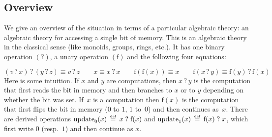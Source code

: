 \documentclass{LMCS}
\newcommand{\hide}[1]{}
\newcommand{\codefont}[1]{\mathtt{#1}}
\newcommand{\defeq}{\mathrel{\,\stackrel{\mbox{\tiny{$\mathrm{def}$}}}=\,}}
\begin{document}
\subsection{Overview}
\label{sec:overview}
\newcommand{\ifp}[3]{\codefont{if}^p~#1~\codefont{then}~#2~\codefont{else}~#3}
\newcommand{\cbvif}[3]{\codefont{if}~#1~\codefont{then}~#2~\codefont{else}~#3}
\newcommand{\sif}[3]{\mathrm{if}~#1~\mathrm{then}~#2~\mathrm{else}~#3}
\newcommand{\oread}[2]{#1\mathrel{?}#2}
\newcommand{\oprint}[1]{\mathrm{p}_{#1}}
\newcommand{\eprint}{\mathtt{print}}
\newcommand{\sprint}{\mathrm{print}}
\newcommand{\etoss}{\mathtt{toss}}
\newcommand{\stoss}{\mathrm{toss}}
\newcommand{\owrite}[2]{\mathrm{update}_{#1}(#2)}
\newcommand{\oflip}[1]{\mathrm{f}(#1)}
\newcommand{\cpsflip}[1]{\mathrm{f}[#1]}
\newcommand{\opread}[3]{#2\mathrel{?_{#1}}#3}
\newcommand{\opwrite}[3]{\mathrm{w}_{#2,#1}(#3)}
\newcommand{\opflip}[2]{\mathrm{f}_{#1}(#2)}
\newcommand{\oreadname}{(?)}
\newcommand{\oflipname}{(\mathrm{f})}
\newcommand{\owritename}[1]{\mathrm{w}_{#1}}
\newcommand{\eread}{\mathtt{deref}}
\newcommand{\ewrite}{\mathtt{assign}}
\newcommand{\eflip}{\mathtt{flip}}
\newcommand{\sread}{\mathrm{read}}
\newcommand{\sflip}{\mathrm{flip}}
\newcommand{\sassign}{\mathrm{write}}
\newcommand{\sderef}{\mathrm{read}}
We give an overview of the situation
in terms of a particular algebraic theory:
an algebraic theory for accessing a single bit of memory.
This is an algebraic theory in the classical sense 
(like monoids, groups, rings, etc.).
It has one binary operation $\oreadname$, a unary operation
$\oflipname$
and the following four equations:
\hide{\begin{equation}
\label{eqn:squareband}
x \equiv \oread {\owrite 0{x_0}} {\owrite 1{x_1}}
\qquad
\owrite i{\oread {x_0}{x_1}}
\equiv
\owrite i{x_i}
\qquad
\owrite i{\owrite j{x}}
\equiv
\owrite j{x}
\end{equation}}
\begin{equation}
\label{eqn:squareband}
\oread {(\oread v x)}{(\oread y z)}\equiv
\oread v z
\qquad
x\equiv \oread x x
\qquad
\oflip {\oflip x}\equiv x
\qquad
\oflip {\oread x y}
\equiv
\oread {\oflip y}{\oflip x}
\end{equation}
Here is some intuition. If $x$ and $y$ are computations,
then $\oread x y$ is the computation that first reads the bit 
in memory
and then branches to $x$ or to $y$ depending on whether the bit was set.
If~$x$ is a computation then $\oflip x$ is the computation that first
flips the bit in memory ($0$ to $1$, $1$ to~$0$) and
then continues as~$x$.
There are derived operations
$\owrite 0x \defeq \oread x{\oflip x}$ and 
$\owrite 1x \defeq \oread {\oflip x}x$,
which first write $0$ (resp.~$1$) and then continue as $x$.
\end{document}
